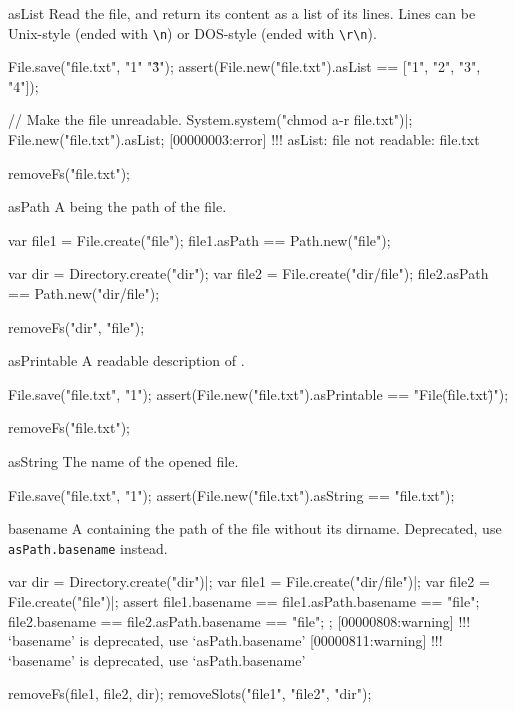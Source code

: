 \begin{urbiscriptapi}
\item[asList] Read the file, and return its content as a list of its lines.
  Lines can be Unix-style (ended with \lstinline|\n|) or DOS-style (ended
  with \lstinline|\r\n|).
\begin{urbiscript}
File.save("file.txt", "1\n"  "3\r{}\r\n");
assert(File.new("file.txt").asList == ["1", "2", "3", "4"]);

// Make the file unreadable.
System.system("chmod a-r file.txt")|;
File.new("file.txt").asList;
[00000003:error] !!! asList: file not readable: file.txt
\end{urbiscript}
\begin{urbicomment}
removeFs("file.txt");
\end{urbicomment}

\item[asPath] A  being the path of the file.
\begin{urbiassert}
var file1 = File.create("file");
file1.asPath == Path.new("file");

var dir = Directory.create("dir");
var file2 = File.create("dir/file");
file2.asPath == Path.new("dir/file");
\end{urbiassert}
\begin{urbicomment}
removeFs("dir", "file");
\end{urbicomment}


\item[asPrintable]
  A readable description of \this.
\begin{urbiscript}
File.save("file.txt", "1\n");
assert(File.new("file.txt").asPrintable == "File(\"file.txt\")");
\end{urbiscript}
\begin{urbicomment}
removeFs("file.txt");
\end{urbicomment}


\item[asString]
  The name of the opened file.
\begin{urbiscript}
File.save("file.txt", "1\n");
assert(File.new("file.txt").asString == "file.txt");
\end{urbiscript}


\item[basename] A  containing the path of the file without
  its dirname.  Deprecated, use \lstinline|asPath.basename| instead.
\begin{urbiscript}
var dir = Directory.create("dir")|;
var file1 = File.create("dir/file")|;
var file2 = File.create("file")|;
assert
{
  file1.basename == file1.asPath.basename == "file";
  file2.basename == file2.asPath.basename == "file";
};
[00000808:warning] !!! `basename' is deprecated, use `asPath.basename'
[00000811:warning] !!! `basename' is deprecated, use `asPath.basename'
\end{urbiscript}
\begin{urbicomment}
removeFs(file1, file2, dir);
removeSlots("file1", "file2", "dir");
\end{urbicomment}



\end{urbiscriptapi}
